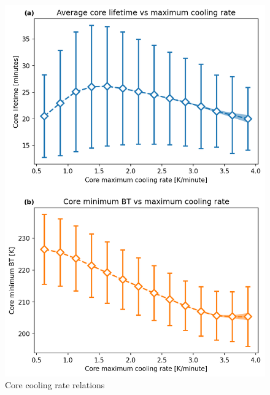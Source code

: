 \begin{figure}[tp]
    \centering
    \includegraphics[width=\textwidth]{figures/ch2_10.png}
    \caption{Core cooling rate relations}
    \label{fig:core_cooling_rate_relations}
\end{figure}


